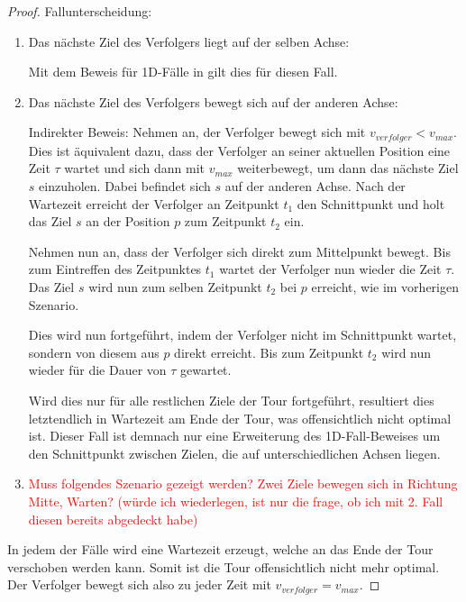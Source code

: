 \documentclass[german,version-2019-11]{uzl-thesis}
\begin{document}
\begin{proof}
Fallunterscheidung:
\begin{enumerate}
\item Das nächste Ziel des Verfolgers liegt auf der selben Achse:

Mit dem Beweis für 1D-Fälle in \cite{helvig} gilt dies für diesen Fall.

\item Das nächste Ziel des Verfolgers bewegt sich auf der anderen Achse:

Indirekter Beweis: Nehmen an, der Verfolger bewegt sich mit $v_{verfolger} < v_{max}$. Dies ist äquivalent dazu, dass der Verfolger an seiner aktuellen Position eine Zeit $\tau$ wartet und sich dann mit $v_{max}$ weiterbewegt, um dann das nächste Ziel $s$ einzuholen. Dabei befindet sich $s$ auf der anderen Achse. Nach der Wartezeit erreicht der Verfolger an Zeitpunkt $t_1$ den Schnittpunkt und holt das Ziel $s$ an der Position $p$ zum Zeitpunkt $t_2$ ein. 

Nehmen nun an, dass der Verfolger sich direkt zum Mittelpunkt bewegt. Bis zum Eintreffen des Zeitpunktes $t_1$ wartet der Verfolger nun wieder die Zeit $\tau$. Das Ziel $s$ wird nun zum selben Zeitpunkt $t_2$ bei $p$ erreicht, wie im vorherigen Szenario. 

Dies wird nun fortgeführt, indem der Verfolger nicht im Schnittpunkt wartet, sondern von diesem aus $p$ direkt erreicht. Bis zum Zeitpunkt $t_2$ wird nun wieder für die Dauer von $\tau$ gewartet. 

Wird dies nur für alle restlichen Ziele der Tour fortgeführt, resultiert dies letztendlich in Wartezeit am Ende der Tour, was offensichtlich nicht optimal ist. Dieser Fall ist demnach nur eine Erweiterung des 1D-Fall-Beweises um den Schnittpunkt zwischen Zielen, die auf unterschiedlichen Achsen liegen.

\item \textcolor{red}{Muss folgendes Szenario gezeigt werden? Zwei Ziele bewegen sich in Richtung Mitte, Warten? (würde ich wiederlegen, ist nur die frage, ob ich mit 2. Fall diesen bereits abgedeckt habe)}
\end{enumerate}

In jedem der Fälle wird eine Wartezeit erzeugt, welche an das Ende der Tour verschoben werden kann. Somit ist die Tour offensichtlich nicht mehr optimal. Der Verfolger bewegt sich also zu jeder Zeit mit $v_{verfolger} = v_{max}$.

\end{proof}
\end{document}
